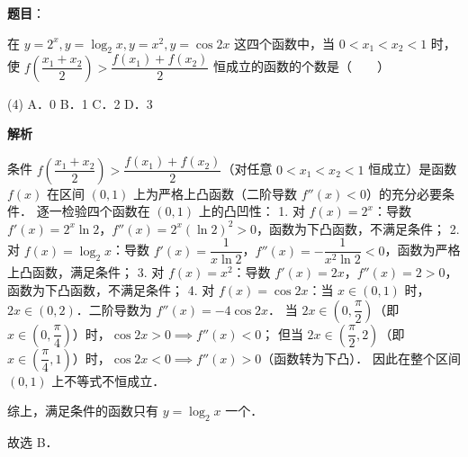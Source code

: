 \begin{answer}

\textbf{题目}：

在 $y = 2^x, y = \log_2 x, y = x^2, y = \cos 2x$ 这四个函数中，当 $0 < x_1 < x_2 < 1$ 时，使 $f\left(\dfrac{x_1 + x_2}{2}\right) > \dfrac{f(x_1) + f(x_2)}{2}$ 恒成立的函数的个数是\mbox{（　　）}

\begin{gkopts}(4)
\task A．0
\task B．1
\task C．2
\task D．3
\end{gkopts}

\textbf{解析}

条件 $f\left(\dfrac{x_1 + x_2}{2}\right) > \dfrac{f(x_1) + f(x_2)}{2}$（对任意 $0 < x_1 < x_2 < 1$ 恒成立）是函数 $f(x)$ 在区间 $(0, 1)$ 上为严格上凸函数（二阶导数 $f''(x) < 0$）的充分必要条件．
逐一检验四个函数在 $(0, 1)$ 上的凸凹性：
1. 对 $f(x) = 2^x$：导数 $f'(x) = 2^x \ln 2$，$f''(x) = 2^x (\ln 2)^2 > 0$，函数为下凸函数，不满足条件；
2. 对 $f(x) = \log_2 x$：导数 $f'(x) = \dfrac{1}{x \ln 2}$，$f''(x) = -\dfrac{1}{x^2 \ln 2} < 0$，函数为严格上凸函数，满足条件；
3. 对 $f(x) = x^2$：导数 $f'(x) = 2x$，$f''(x) = 2 > 0$，函数为下凸函数，不满足条件；
4. 对 $f(x) = \cos 2x$：当 $x \in (0, 1)$ 时，$2x \in (0, 2)$．二阶导数为 $f''(x) = -4\cos 2x$．
   当 $2x \in \left(0, \dfrac{\pi}{2}\right)$（即 $x \in \left(0, \dfrac{\pi}{4}\right)$）时，$\cos 2x > 0 \implies f''(x) < 0$；
   但当 $2x \in \left(\dfrac{\pi}{2}, 2\right)$（即 $x \in \left(\dfrac{\pi}{4}, 1\right)$）时，$\cos 2x < 0 \implies f''(x) > 0$（函数转为下凸）．
   因此在整个区间 $(0, 1)$ 上不等式不恒成立．

综上，满足条件的函数只有 $y = \log_2 x$ 一个．

故选 B．


\end{answer}
